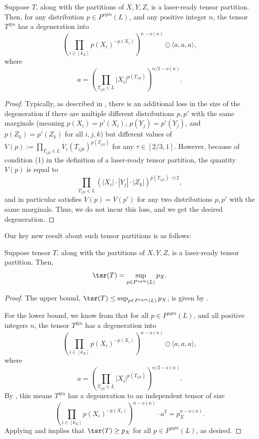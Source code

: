 \documentclass{toc}
\begin{document}
\begin{theorem} \label{laserthm}
Suppose $T$, along with the partitions of $X,Y,Z$, is a laser-ready tensor partition. Then, for any distribution $p\in P^{sym}(L)$, and any positive integer $n$, the tensor $T^{\otimes n}$ has a degeneration into $$\left(\prod_{i \in [k_X]} p(X_i)^{-p(X_i)}\right)^{n - o(n)} \odot \langle a,a,a \rangle,$$
where 
$$a = \left( \prod_{T_{ijk} \in L} |X_i| ^{p(T_{ijk})} \right)^{n/2 - o(n)}.$$
\end{theorem}

\begin{proof}
Typically, as described in \cite[Section~3]{v12}, there is an additional loss in the size of the degeneration if there are multiple different distributions $p, p'$ with the same marginals (meaning $p(X_i) = p'(X_i)$, $p(Y_j) = p'(Y_j)$, and $p(Z_k) = p'(Z_k)$ for all $i,j,k$) but different values of $V(p) := \prod_{T_{ijk} \in L} V_{\tau}(T_{ijk})^{p(T_{ijk})}$ for any $\tau \in [2/3, 1]$. However, because of condition (1) in the definition of a laser-ready tensor partition, the quantity $V(p)$ is equal to 
$$ \prod_{T_{ijk} \in L} (|X_i| \cdot |Y_j| \cdot |Z_k|)^{p(T_{ijk})\cdot \tau /2},$$
and in particular satisfies $V(p) = V(p')$ for any two distributions $p,p'$ with the same marginals. Thus, we do not incur this loss, and we get the desired degeneration. 
\end{proof}

Our key new result about such tensor partitions is as follows:

\begin{theorem}\label{thmlaseropt}
Suppose tensor $T$, along with the partitions of $X,Y,Z$, is a laser-ready tensor partition. Then, $$\tsr(T) = \sup_{p \in P^{sym}(L)} p_X.$$
\end{theorem}

\begin{proof}
The upper bound, $\tsr(T) \leq \sup_{p \in P^{sym}(L)} p_X$, is given by .

For the lower bound, we know from  that for all $p \in P^{sym}(L)$, and all positive integers $n$, the tensor $T^{\otimes n}$ has a degeneration into $$\left(\prod_{i \in [k_X]} p(X_i)^{-p(X_i)}\right)^{n - o(n)} \odot \langle a,a,a \rangle,$$
where 
$$a = \left( \prod_{T_{ijk} \in L} |X_i| ^{p(T_{ijk})} \right)^{n/2 - o(n)}.$$
By , this means $T^{\otimes n}$ has a degeneration to an independent tensor of size
$$\left(\prod_{i \in [k_X]} p(X_i)^{-p(X_i)}\right)^{n - o(n)} \cdot a^2 = p_X^{n - o(n)}.$$
Applying  and  implies that $\tsr(T) \geq p_X$ for all $p \in P^{sym}(L)$, as desired.
\end{proof}
\end{document}
